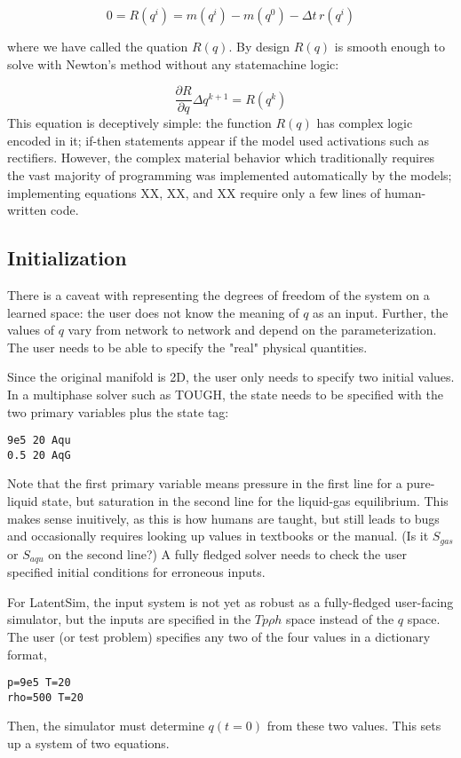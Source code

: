 \documentclass[]{article}
\begin{document}
\begin{equation}
0 = R(q^i) = m(q^{i}) - m(q^{0}) - \Delta t \, r(q^i)
\end{equation}

where we have called the quation \(R(q)\). By design \(R(q)\) is smooth
enough to solve with Newton's method without any statemachine logic:

\begin{equation}
\frac{\partial R}{\partial q} \Delta q^{k+1} = R(q^k)
\end{equation}
This equation is deceptively simple: the function \(R(q)\) has complex logic encoded in it; if-then
statements appear if the model used activations such as rectifiers.
However, the complex material behavior which traditionally requires
the vast majority of programming was implemented automatically by the
models; implementing equations XX, XX, and XX require only a few lines
of human-written code. 

\hypertarget{header-n3339}{%
\subsection{Initialization}\label{header-n3339}}

There is a caveat with representing the degrees of freedom of the system
on a learned space: the user does not know the meaning of \(q\) as an
input. Further, the values of \(q\) vary from network to network and
depend on the parameterization. The user needs to be able to specify the
"real" physical quantities.

Since the original manifold is 2D, the user only needs to specify two
initial values. In a multiphase solver such as TOUGH, the state needs
to be specified with the two primary variables plus the state tag: 
\begin{verbatim}
9e5 20 Aqu
0.5 20 AqG
\end{verbatim}
Note that the first primary variable means pressure in the first line
for a pure-liquid state,
but saturation in the second line for the liquid-gas equilibrium.
This makes sense inuitively, as this is how humans are taught, but
still leads to bugs and occasionally requires looking up values in
textbooks or the manual. (Is it $S_{gas}$ or $S_{aqu}$ on the second
line?) A fully fledged solver needs to check the user specified
initial conditions for erroneous inputs.

For LatentSim, the input system is not yet as robust as a
fully-fledged user-facing simulator, but the inputs are specified in
the $T p \rho h$ space instead of the $q$ space.
The user (or test problem) specifies any two of the four values in a
dictionary format,
\begin{verbatim}
p=9e5 T=20
rho=500 T=20
\end{verbatim}
Then, the simulator must determine $q(t=0)$ from these two
values. This sets up a system of two equations.
\end{document}
